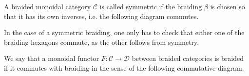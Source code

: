 \documentclass[../thesis.tex]{subfiles}
\begin{document}
        \begin{definition}
            A braided monoidal category $\mathcal{C}$ is called symmetric if the braiding $\beta$ is chosen so that it has its own inverses, i.e. the following diagram commutes.
            \begin{center}
            \end{center}
        \end{definition}

        In the case of a symmetric braiding, one only has to check that either one of the braiding hexagons commute, as the other follows from symmetry.

        \begin{definition}
            We say that a monoidal functor $F : \mathcal{C} \rightarrow \mathcal{D}$ between braided categories is braided if it commutes with braiding in the sense of the following commutative diagram.
            \begin{center}
            \end{center}
        \end{definition}
\end{document}
